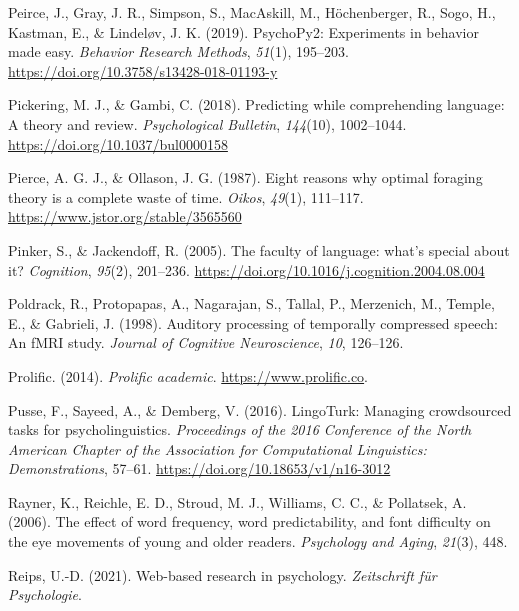 \documentclass[a4paper, nobind]{templates/ociamthesis}
\newlength{\cslhangindent}
\newenvironment{CSLReferences}[2] %
 {%
  \setlength{\parindent}{0pt}
  \ifodd #1
  \let\oldpar\par
  \def\par{\hangindent=\cslhangindent\oldpar}
  \fi
  \setlength{\parskip}{1mm}
  \setlength{\baselineskip}{6mm}
 }%
 {}
\begin{document}
\begin{CSLReferences}{1}{0}
\leavevmode{}%
Peirce, J., Gray, J. R., Simpson, S., MacAskill, M., Höchenberger, R., Sogo, H., Kastman, E., \& Lindeløv, J. K. (2019). {PsychoPy2: Experiments in behavior made easy}. \emph{Behavior Research Methods}, \emph{51}(1), 195--203. \url{https://doi.org/10.3758/s13428-018-01193-y}

\leavevmode{}%
Pickering, M. J., \& Gambi, C. (2018). Predicting while comprehending language: A theory and review. \emph{Psychological Bulletin}, \emph{144}(10), 1002--1044. \url{https://doi.org/10.1037/bul0000158}

\leavevmode{}%
Pierce, A. G. J., \& Ollason, J. G. (1987). {Eight reasons why optimal foraging theory is a complete waste of time}. \emph{Oikos}, \emph{49}(1), 111--117. \url{https://www.jstor.org/stable/3565560}

\leavevmode{}%
Pinker, S., \& Jackendoff, R. (2005). The faculty of language: what's special about it? \emph{Cognition}, \emph{95}(2), 201--236. \url{https://doi.org/10.1016/j.cognition.2004.08.004}

\leavevmode{}%
Poldrack, R., Protopapas, A., Nagarajan, S., Tallal, P., Merzenich, M., Temple, E., \& Gabrieli, J. (1998). Auditory processing of temporally compressed speech: An fMRI study. \emph{Journal of Cognitive Neuroscience}, \emph{10}, 126--126.

\leavevmode{}%
Prolific. (2014). \emph{Prolific academic}. \url{https://www.prolific.co}.

\leavevmode{}%
Pusse, F., Sayeed, A., \& Demberg, V. (2016). {LingoTurk: Managing crowdsourced tasks for psycholinguistics}. \emph{Proceedings of the 2016 Conference of the North American Chapter of the Association for Computational Linguistics: Demonstrations}, 57--61. \url{https://doi.org/10.18653/v1/n16-3012}

\leavevmode{}%
Rayner, K., Reichle, E. D., Stroud, M. J., Williams, C. C., \& Pollatsek, A. (2006). The effect of word frequency, word predictability, and font difficulty on the eye movements of young and older readers. \emph{Psychology and Aging}, \emph{21}(3), 448.

\leavevmode{}%
Reips, U.-D. (2021). Web-based research in psychology. \emph{Zeitschrift f{ü}r Psychologie}.


\end{CSLReferences}
\end{document}
